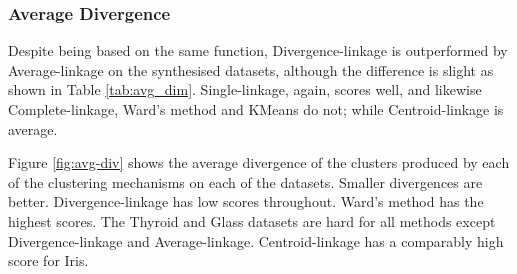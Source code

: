 \subsubsection{Average Divergence}
Despite being based on the same function, Divergence-linkage is outperformed by Average-linkage on the synthesised datasets, although the difference is slight as shown in Table \ref{tab:avg_dim}.  Single-linkage, again, scores well, and likewise Complete-linkage, Ward's method and KMeans do not; while Centroid-linkage is average.

Figure \ref{fig:avg-div} shows the average divergence of the clusters produced by each of the clustering mechanisms on each of the datasets.  Smaller divergences are better.  Divergence-linkage has low scores throughout.  Ward's method has the highest scores.  The Thyroid and Glass datasets are hard for all methods except Divergence-linkage and Average-linkage.  Centroid-linkage has a comparably high score for Iris.

